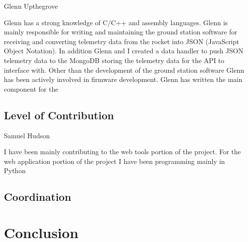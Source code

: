 \documentclass[onecolumn, draftclsnofoot,10pt, compsoc]{IEEEtran}
\begin{document}
Glenn Upthegrove

Glenn has a strong knowledge of C/C++ and assembly languages. Glenn is mainly responsible for writing and maintaining the ground station software for receiving and converting telemetry data from the rocket into JSON (JavaScript Object Notation). In addition Glenn and I created a data handler to push JSON telemetry data to the MongoDB storing the telemetry data for the API to interface with. Other than the development of the ground station software Glenn has been actively involved in firmware development. Glenn has written the main component for the 


\subsection{Level of Contribution}

Samuel Hudson

I have been mainly contributing to the web tools portion of the project. For the web application portion of the project I have been programming mainly in Python 
\subsection{Coordination}

\section{Conclusion}
\end{document}
